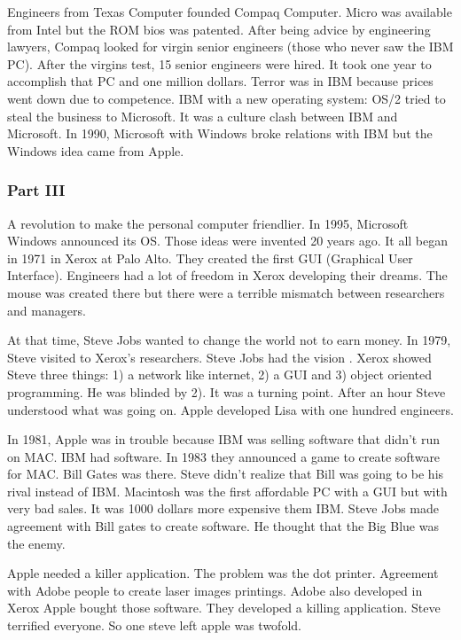  Engineers from Texas Computer founded Compaq Computer. 
 Micro was available from Intel but the ROM bios was patented.
 After being advice by engineering lawyers, Compaq looked for virgin senior engineers 
 (those who never saw the IBM PC).  After the virgins test, 15 senior engineers were hired. 
 It took one year to accomplish that PC and one million dollars. 
 Terror was in IBM because prices went down due to competence.   
 IBM with a new operating system: OS/2 tried to steal the business to Microsoft. 
 It was a culture clash between IBM and Microsoft. 
 In 1990,  Microsoft with Windows broke 
 relations with IBM but the Windows idea came from Apple.   
   
  

 \subsubsection*{Part III} 
 A revolution to make the personal computer friendlier.  
 In 1995,  Microsoft Windows announced its OS. 
 Those ideas were invented 20 years ago. 
 It all began in 1971 in  Xerox at Palo Alto. 
 They created the first GUI (Graphical User Interface).
 Engineers had a lot of freedom in Xerox developing  their dreams. The mouse was 
 created there but there were a terrible mismatch between researchers and managers. 
 
 At that time, Steve Jobs wanted to change the world not to earn money.
 In 1979, Steve  visited to Xerox's researchers. 
 Steve Jobs had the vision . Xerox showed Steve three things: 1) a network like internet, 
 2) a GUI and  3) object oriented programming. He 
 was blinded by 2). It was a turning point. 
 After an hour Steve understood what was going on. 
 Apple developed Lisa with one hundred engineers. 
   
 In 1981, Apple was in trouble because IBM was selling software that didn't run on MAC. 
 IBM had software. In 1983 they announced a game to 
 create software for MAC. Bill Gates was there. 
 Steve didn't realize that Bill was going to be his rival instead of IBM. 
 Macintosh was the first 
 affordable PC with a GUI but with  very bad sales. 
 It was 1000 dollars more expensive them IBM.  
 Steve Jobs made agreement with Bill gates to create software. 
 He thought that the Big Blue was the enemy. 
   
   
 Apple needed a killer application. 
 The problem was the dot printer. Agreement with Adobe people to create laser images printings. 
 Adobe also developed in Xerox 
 Apple bought those software.
 They developed a killing application. 
 Steve terrified everyone. 
 So one steve left apple was twofold. 
   
